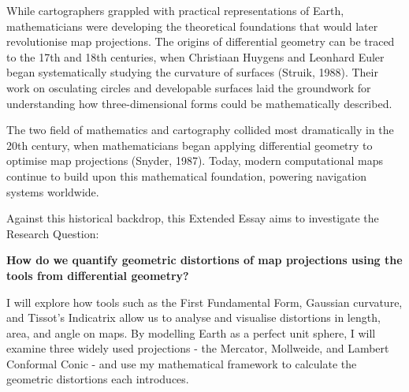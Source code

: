 While cartographers grappled with practical representations of Earth, 
mathematicians were developing the theoretical foundations that would later 
revolutionise map projections. The origins of differential geometry can be 
traced to the 17th and 18th centuries, when Christiaan Huygens and Leonhard 
Euler began systematically studying the curvature of surfaces (Struik, 1988). 
Their work on osculating circles and developable surfaces laid the groundwork 
for understanding how three-dimensional forms could be mathematically 
described.

The two field of mathematics and cartography collided most dramatically in the 
20th century, when mathematicians began applying differential geometry to 
optimise map projections (Snyder, 1987). Today, modern computational maps 
continue to build upon this mathematical foundation, powering navigation 
systems worldwide. 

Against this historical backdrop, this Extended Essay aims to investigate the 
Research Question:

\textbf{How do we quantify geometric distortions of map projections using the tools from 
differential geometry?}

I will explore how tools such as the First Fundamental Form, Gaussian 
curvature, and Tissot's Indicatrix allow us to analyse and visualise 
distortions in length, area, and angle on maps. By modelling Earth as a 
perfect unit sphere, I will examine three widely used projections - the Mercator, 
Mollweide, and Lambert Conformal Conic - and use my mathematical framework to 
calculate the geometric distortions each introduces.
